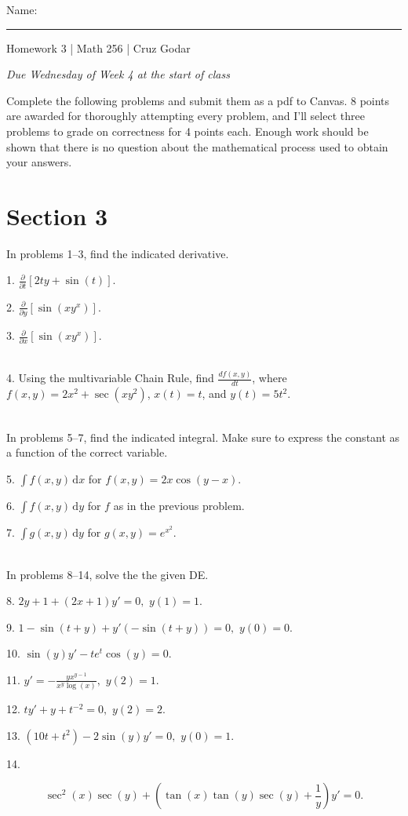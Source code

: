 \documentclass{article}
\begin{document}
\Large Name: \rule{2in}{0.15mm} \hfill Homework 3 | Math 256 | Cruz Godar \vspace{4pt}  \normalsize

\textit{Due Wednesday of Week 4 at the start of class}

Complete the following problems and submit them as a pdf to Canvas. 8 points are awarded for thoroughly attempting every problem, and I'll select three problems to grade on correctness for 4 points each. Enough work should be shown that there is no question about the mathematical process used to obtain your answers.

\section{Section 3}

In problems 1--3, find the indicated derivative.

1. $\displaystyle \frac{\partial }{\partial t} \left[ 2ty + \sin(t) \right].$

2. $\displaystyle \frac{\partial }{\partial y} \left[ \sin(xy^x) \right].$

3. $\displaystyle \frac{\partial }{\partial x} \left[ \sin(xy^x) \right].$

~\\

4. Using the multivariable Chain Rule, find $\displaystyle \frac{d f(x, y)}{dt}$, where $\displaystyle f(x, y) = 2x^2 + \sec(xy^2)$, $x(t) = t$, and $y(t) = 5t^2$.

~\\

In problems 5--7, find the indicated integral. Make sure to express the constant as a function of the correct variable.

5. $\displaystyle \int f(x, y)\,\mathrm{d} x$ for $\displaystyle f(x, y) = 2x\cos(y - x).$

6. $\displaystyle \int f(x, y)\,\mathrm{d} y$ for $f$ as in the previous problem.

7. $\displaystyle \int g(x, y)\,\mathrm{d} y$ for $\displaystyle g(x, y) = e^{x^2}.$

~\\

In problems 8--14, solve the the given DE.

8. $\displaystyle 2y + 1 + (2x + 1)y' = 0,$ $\displaystyle y(1) = 1.$

9. $\displaystyle 1 - \sin(t + y) + y'(-\sin(t + y)) = 0,$ $\displaystyle y(0) = 0.$

10. $\displaystyle \sin(y)y' - te^t\cos(y) = 0.$

11. $\displaystyle y' = -\frac{yx^{y - 1}}{x^y\log(x)},$ $\displaystyle y(2) = 1.$

12. $\displaystyle ty' + y + t^{-2} = 0,$ $\displaystyle y(2) = 2.$

13. $\displaystyle (10t + t^2) - 2\sin(y)y' = 0,$ $\displaystyle y(0) = 1.$

14.

$$
	\sec^2(x)\sec(y) + \left( \tan(x) \tan(y) \sec(y) + \frac{1}{y} \right)y' = 0.
$$
\end{document}
